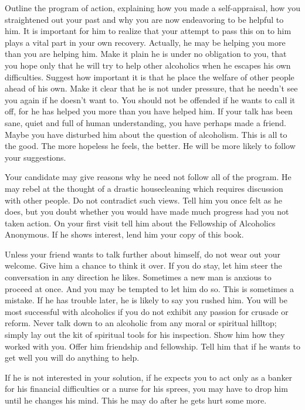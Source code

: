 \begin{biblechapter}
Outline the program of action, explaining how you made a self-appraisal, how you straightened out your past and why you are now endeavoring to be helpful to him.  It is important for him to realize that your attempt to pass this on to him plays a vital part in your own recovery.  Actually, he may be helping you more than you are helping him.  Make it plain he is under no obligation to you, that you hope only that he will try to help other alcoholics when he escapes his own difficulties.  Suggest how important it is that he place the welfare of other people ahead of his own.  Make it clear that he is not under pressure, that he needn't see you again if he doesn't want to.  You should not be offended if he wants to call it off, for he has helped you more than you have helped him.  If your talk has been sane, quiet and full of human understanding, you have perhaps made a friend.  Maybe you have disturbed him about the question of alcoholism.  This is all to the good.  The more hopeless he feels, the better.  He will be more likely to follow your suggestions.

Your candidate may give reasons why he need not follow all of the program.  He may rebel at the thought of a drastic housecleaning which requires discussion with other people.  Do not contradict such views.  Tell him you once felt as he does, but you doubt whether you would have made much progress had you not taken action.  On your first visit tell him about the Fellowship of Alcoholics Anonymous.  If he shows interest, lend him your copy of this book.

Unless your friend wants to talk further about himself, do not wear out your welcome.  Give him a chance to think it over.  If you do stay, let him steer the conversation in any direction he likes.  Sometimes a new man is anxious to proceed at once. And you may be tempted to let him do so.  This is sometimes a mistake.  If he has trouble later, he is likely to say you rushed him.  You will be most successful with alcoholics if you do not exhibit any passion for crusade or reform.  Never talk down to an alcoholic from any moral or spiritual hilltop; simply lay out the kit of spiritual tools for his inspection.  Show him how they worked with you.  Offer him friendship and fellowship.  Tell him that if he wants to get well you will do anything to help.

If he is not interested in your solution, if he expects you to act only as a banker for his financial difficulties or a nurse for his sprees, you may have to drop him until he changes his mind.  This he may do after he gets hurt some more.


\end{biblechapter}
